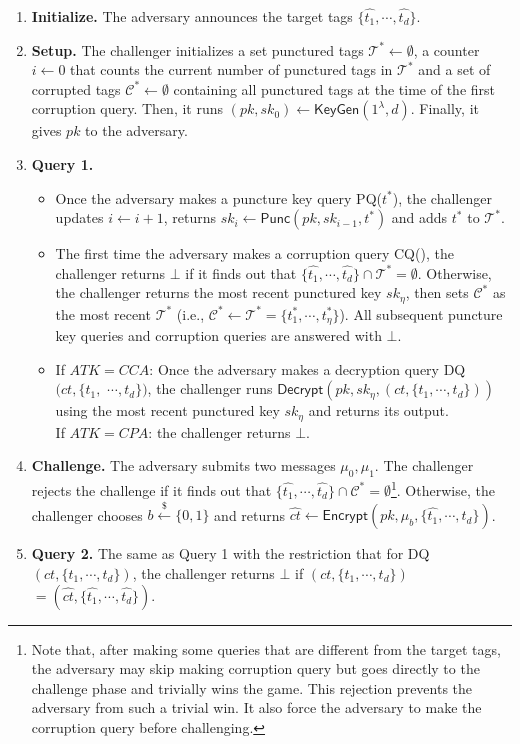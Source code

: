 \documentclass[runningheads,10pt]{llncs}
\begin{document}
\begin{enumerate}
	\item \textbf{Initialize.} 
	The adversary announces the target tags $\{\widehat{t_1}, \cdots, \widehat{t_d}\}$. 
	\item \textbf{Setup.} 
	The challenger initializes a set punctured tags $\mathcal{T}^* \leftarrow \emptyset$, 
	a counter  $i\leftarrow 0$ that counts the current number of punctured tags in $\mathcal{T}^*$ 
	and a set of corrupted tags $\mathcal{C}^* \leftarrow \emptyset$ containing all punctured tags at the time of the first corruption query. 
	Then, it runs $(pk, sk_0) \leftarrow \textsf{KeyGen}(1^\lambda, d)$. Finally, it gives $pk$ to the adversary.
	\item \textbf{Query 1.}
	\begin{itemize}
		\item Once the adversary makes a puncture key query PQ($t^*$), 
		the challenger updates $i \leftarrow i+1$, 
		returns $sk_{i} \leftarrow \textsf{Punc}(pk, sk_{i-1},t^*)$ and adds $t^*$ to $\mathcal{T}^*$.
		\item The first time the adversary makes a corruption query CQ(), 
		the challenger returns $\bot$ if it finds out that $\{\widehat{t_1}, \cdots, \widehat{t_d}\} \cap \mathcal{T}^*= \emptyset$. 		
		Otherwise, the challenger returns the most recent punctured key 
		$sk_\eta$, then sets $\mathcal{C}^*$ as  the most recent 
		$\mathcal{T}^*$ (i.e., $\mathcal{C}^* \leftarrow \mathcal{T}^*=\{t_1^*, \cdots, t^*_\eta\}$). 
		All subsequent puncture key queries and corruption queries are answered with $\bot$. 
		\item If $ATK=CCA$: Once the adversary makes a decryption query  DQ$(ct,\{t_1, $ $\cdots, t_d\})$, 
		the challenger runs $\textsf{Decrypt}(pk, sk_{\eta},  (ct,\{t_1, \cdots, t_d\}))$ 
		using the most recent punctured key $sk_\eta$ and returns its output. \\
		If $ATK=CPA$: the challenger returns $\bot$.
	\end{itemize}
	\item \textbf{Challenge.} 
	The adversary submits two messages $\mu_0, \mu_1$. 
	The challenger rejects the challenge if it finds out
	that $\{\widehat{t_1}, \cdots, \widehat{t_d}\} \cap \mathcal{C}^*= \emptyset$\footnote{Note that, after making some queries that are different from the target tags, the adversary may skip making corruption query but goes directly to the challenge phase and trivially wins the game. This rejection prevents the adversary from such a trivial win. It also force the adversary to make the corruption query before challenging.}. 
	Otherwise, the challenger chooses $b \xleftarrow{\$} \{0,1\}$ and 
	returns $\widehat{ct} \leftarrow \textsf{Encrypt}(pk,\mu_b, \{\widehat{t_1}, \cdots, \widehat{t_d}\})$.  
	\item \textbf{Query 2.} The same as Query 1 with the  restriction that
		for DQ$(ct,\{t_1, \cdots, t_d\})$, the challenger returns $\bot$ if $(ct,\{t_1, \cdots, t_d \})$ 
		$=(\widehat{ct}, \{\widehat{t_1}, \cdots, \widehat{t_d}\} )$.
	

\end{enumerate}
\end{document}
